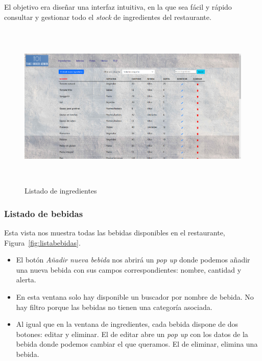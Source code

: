 El objetivo era diseñar una interfaz intuitiva, en la que sea fácil y rápido consultar y gestionar todo el \textit{stock} de ingredientes del restaurante.

\begin{figure}[h]
    \centering
    \includegraphics[width=15cm, height=8cm]{Imagenes/Figuras/listaingredientes.png} 
   \caption{Listado de ingredientes\label{fig:listaingredientes}}
\end{figure}

\subsubsection*{Listado de bebidas}

Esta vista nos muestra todas las bebidas disponibles en el restaurante, Figura~\ref{fig:listabebidas}. \begin{itemize} 

\item El botón \textit{Añadir nueva bebida} nos abrirá un \textit{pop up} donde podemos añadir una nueva bebida con sus campos correspondientes: nombre, cantidad y alerta. 

\item En esta ventana solo hay disponible un buscador por nombre de bebida. No hay filtro porque las bebidas no tienen una categoría asociada.

\item Al igual que en la ventana de ingredientes, cada bebida dispone de dos botones: editar y eliminar. El de editar abre un \textit{pop up} con los datos de la bebida donde podemos cambiar el que queramos. El de eliminar, elimina una bebida.


\end{itemize}

